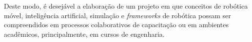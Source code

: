 Deste modo, é desejável a elaboração de um projeto em que conceitos de robótica móvel, inteligência artificial, simulação e \textit{frameworks} de robótica possam ser compreendidos em processos colaborativos de capacitação ou em ambientes acadêmicos, principalmente, em cursos de engenharia.       

\begin{comment}
\section{Organização do trabalho}
\label{section:organizacao}

Este documento apresenta $5$ capítulos e está estruturado da seguinte forma:

\begin{itemize}

  \item \textbf{Capítulo \ref{chap:intro} - Introdução}: Contextualiza o âmbito, no qual a pesquisa proposta está inserida. Apresenta, portanto, a definição do problema, objetivos e justificativas da pesquisa e como este \thetypeworkthree está estruturado;
  \item \textbf{Capítulo \ref{chap:fundteor} - Fundamentação Teórica}: XXX;
  \item \textbf{Capítulo \ref{chap:mat} - Materiais e Métodos}: XXX;
  \item \textbf{Capítulo \ref{chap:result} - Resultados}: XXX;
  \item \textbf{Capítulo \ref{chap:conc} - Conclusão}: Apresenta as conclusóes, contribuições e algumas sugestões de atividades de pesquisa a serem desenvolvidas no futuro.

\end{itemize}
\end{comment}